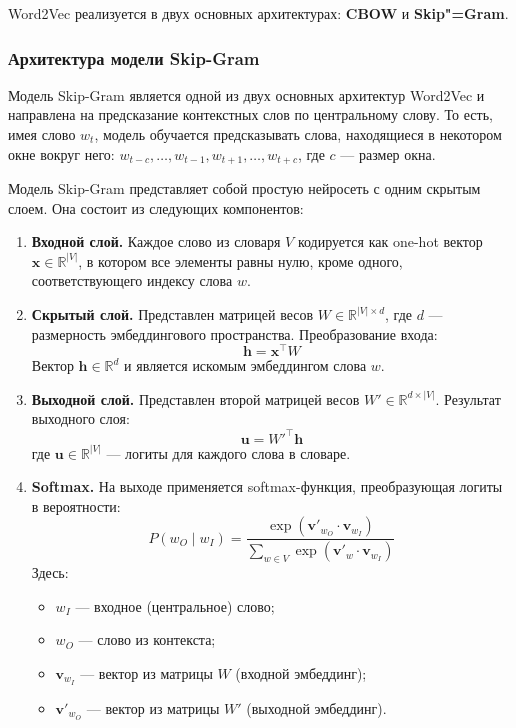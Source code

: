 \documentclass[coursework]{SCWorks}
\begin{document}
Word2Vec реализуется в двух основных архитектурах: \textbf{CBOW} и \textbf{Skip"=Gram}.

\subsubsection{Архитектура модели Skip-Gram}

Модель Skip-Gram является одной из двух основных архитектур Word2Vec и направлена на предсказание контекстных слов по центральному слову. То есть, имея слово $w_t$, модель обучается предсказывать слова, находящиеся в некотором окне вокруг него: $w_{t-c}, \dots, w_{t-1}, w_{t+1}, \dots, w_{t+c}$, где $c$ — размер окна.


Модель Skip-Gram представляет собой простую нейросеть с одним скрытым слоем. Она состоит из следующих компонентов:

\begin{enumerate}
  \item \textbf{Входной слой.}  
  Каждое слово из словаря $V$ кодируется как one-hot вектор $\mathbf{x} \in \mathbb{R}^{|V|}$, в котором все элементы равны нулю, кроме одного, соответствующего индексу слова $w$.

  \item \textbf{Скрытый слой.}  
  Представлен матрицей весов $W \in \mathbb{R}^{|V| \times d}$, где $d$ — размерность эмбеддингового пространства. Преобразование входа:
  \[
  \mathbf{h} = \mathbf{x}^\top W
  \]
  Вектор $\mathbf{h} \in \mathbb{R}^d$ и является искомым эмбеддингом слова $w$.

  \item \textbf{Выходной слой.}  
  Представлен второй матрицей весов $W' \in \mathbb{R}^{d \times |V|}$. Результат выходного слоя:
  \[
  \mathbf{u} = W'^\top \mathbf{h}
  \]
  где $\mathbf{u} \in \mathbb{R}^{|V|}$ — логиты для каждого слова в словаре.

  \item \textbf{Softmax.}  
  На выходе применяется softmax-функция, преобразующая логиты в вероятности:
  \[
  P(w_O \mid w_I) = \frac{\exp(\mathbf{v}'_{w_O} \cdot \mathbf{v}_{w_I})}{\sum_{w \in V} \exp(\mathbf{v}'_w \cdot \mathbf{v}_{w_I})}
  \]
  Здесь:
  \begin{itemize}
    \item $w_I$ — входное (центральное) слово;
    \item $w_O$ — слово из контекста;
    \item $\mathbf{v}_{w_I}$ — вектор из матрицы $W$ (входной эмбеддинг);
    \item $\mathbf{v}'_{w_O}$ — вектор из матрицы $W'$ (выходной эмбеддинг).
  \end{itemize}
\end{enumerate}
\end{document}
